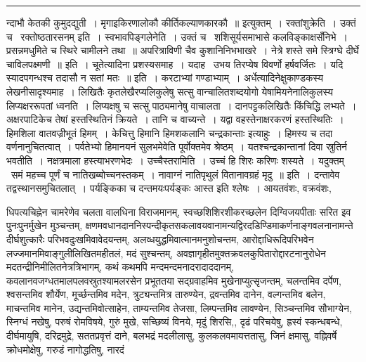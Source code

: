 \documentclass[11pt, openany]{book}
\begin{document}
\vspace{2mm}
\hrule

\noindent
{\s न्दाभौ केतकी कुमुदद्युती~। मृगाइकिरणालोकौ कीर्तिकल्याणकारकौ~॥ इत्युक्तम्~। {\qtt रक्तांशुक्रेति}~। उक्तं च \textendash\ {\qt रक्तोष्ठतारसनम्} इति~। {\qtt स्वभावपिङ्गलेनेति}~। उक्तं च \textendash\ {\qt शशिसूर्यसमाभासे कलविङ्काक्षसँनिभे~। प्रसन्नमधुमिते च स्थिरे चामीलने तथा~॥ अपरित्राविणी चैव कुशानिनिभभाखरे~। नेत्रे शस्ते समे स्त्रिग्घे दीर्घे चाविलपक्ष्मणी~॥} इति~। चूतेत्यादिना प्रशस्यसमाह~। यदाह \textendash\ {\qt उभय तिरप्येष विवर्णो हर्षवर्जितः~। यदि स्यादपगन्धश्च तदासौ न सतां मतः~॥} इति~। करटाभ्यां गण्डाभ्याम्~। अर्धेत्यादिनेक्षुकाण्डकस्य लेखनीसादृश्यमाह~। लिखितैः कृतलेखैरप्यलिकुलेषु सत्सु वान्चालितशब्दयोगो येषामियनेनालिकुलस्य लिप्यक्षररूपतां ध्वनति~। लिप्यक्षषु च सत्सु पाठ्यमानेषु वाचालता~। दानपट्टकलिखितैः किंचिद्धि लभ्यते~। अक्षरपाटिकेच तेषां हस्तस्थितिनं क्रियते~। तानि च वाच्यन्ते~। यद्वा वहस्तेनाक्षरकरणं हस्तस्थितिः~। हिमशिला वातवज्रीभूतं हिमम्~। केचित्तु {\qt हिमानि हिमशकलानि चन्द्रकान्ताः} इत्याहुः~। हिमस्य च तदा वर्णनानुचितत्वात्~। पर्वतेभ्यो हिमानयनं सुलभमेवेति पूर्वोक्तमेव श्रेष्ठम्~। यतश्चन्द्रकान्तानां दिवा स्रुतिर्न भवतीति~। नक्षत्रमाला हस्त्याभरणभेदः~। {\qtt उच्चैस्तरामिति}~। उच्चं हि शिरः करिणः शस्यते~। यदुक्तम् \textendash\ {\qt समं महच्च पूर्णं च नातिखब्बोच्चनस्तकम्~। नावाग्नं नातिपृथुलं वितानावग्रहं मृदु~॥} इति~। दन्तावेव तद्वस्थानसमुचितलात्~। पर्यङ्किका च दन्तमयःपर्यङ्कः आस्त इति श्लेषः~। आयतवंशः, वक्रवंशः,}

\newpage

\noindent
धिपत्यचिह्नेन चामरेणेव चलता वालधिना विराजमानम्, स्वच्छशिशिरशीकरच्छलेन दिग्विजयपीताः सरित इव पुनःपुनर्मुखेन मुञ्चन्तम्, क्षणमवधानदाननिस्पन्दीकृतसकलावयवानामन्यद्विरदडिण्डिमाकर्णनाङ्गवलनानामन्ते दीर्घशुत्कारैः परिभवदुःखमिवावेदयन्तम्, अलव्धयुद्धमिवात्मानमनुशोचन्तम, आरोद्दाधिरूदिपरिभवेन लज्जमानमिवाङ्गुलीलिखितमहीतलं, मदं सुश्चन्तम्, अवज्ञागृहीतमुक्तक्रवलकुपितारोद्दारटनानुरोधेन मदतन्द्रीनिमीलितनेत्रत्रिभागम्, कथं कथमपि मन्दमन्दमनादरादाददानम्, कवलानवजग्धतमालपलवस्रुतश्यामलरसेन प्रभूततया सद्ग्रवाहमिव मुखेनाप्युत्सृजन्तम्, चलन्तमिव दर्पेण, श्वसन्तमिव शौर्येण, मूर्च्छन्तमिव मदेन, त्रुट्यन्तमित्र तारुण्येन, द्रवन्तमिव दानेन, वल्गन्तमिव बलेन, माचन्तमिव मानेन, उद्यन्तमिवोत्साहेन, ताम्यन्तमिव तेजसा, लिम्पन्तमिव लावण्येन, सिञ्चन्तमिव सौभाग्येन, स्निग्धं नखेषु, परुषं रोमविषये, गुरुं मुखे, सच्छिष्यं विनये, मृदुं शिरसि,, दृढं परिचयेषु, ह्रस्वं स्कन्धबन्धे, दीर्घमायुषि, दरिद्रमुद्रे, सततप्रवृत्तं दाने, बलभद्रं मदलीलासु, कुलकलवमायत्ततासु, जिनं क्षमासु, वह्निवर्षे क्रोधमोक्षेषु, गरुडं नागोद्धतिषु, नारदं
\end{document}
